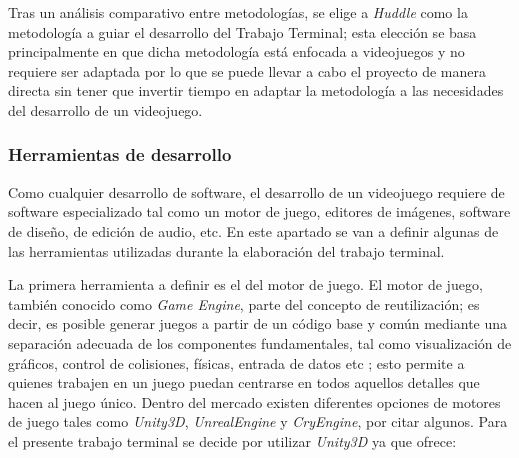 Tras un análisis comparativo entre metodologías, se elige a
\textit{Huddle}  como la metodología a guiar el desarrollo del Trabajo Terminal;
esta elección se basa principalmente en que dicha metodología está enfocada a
videojuegos y no requiere ser adaptada por lo que se puede llevar a cabo el
proyecto de manera directa sin tener que invertir tiempo en adaptar la metodología
a las necesidades del desarrollo de un videojuego.

\subsubsection{Herramientas de desarrollo}
Como cualquier desarrollo de software, el desarrollo de un videojuego requiere
de software especializado tal como un motor de juego, editores de imágenes, software
de diseño, de edición de audio, etc. En este apartado se van a definir algunas de
las herramientas utilizadas durante la elaboración del trabajo terminal.
\\
\par
La primera herramienta a definir es el del motor de juego. El motor de juego,
también conocido como \textit{Game Engine}, parte del concepto de reutilización;
es decir, es posible generar juegos a partir de un código base y común mediante una
separación adecuada de los componentes fundamentales, tal como visualización de
gráficos, control de colisiones, físicas, entrada de datos etc \cite{Ref:MutorGraf};
esto permite a quienes trabajen en un juego puedan centrarse en todos aquellos
detalles que hacen al juego único. Dentro del mercado existen diferentes
opciones de motores de juego tales como \textit{Unity3D}, \textit{UnrealEngine}
y \textit{CryEngine}, por citar algunos. Para el presente trabajo terminal se
decide por utilizar \textit{Unity3D} ya que ofrece:

